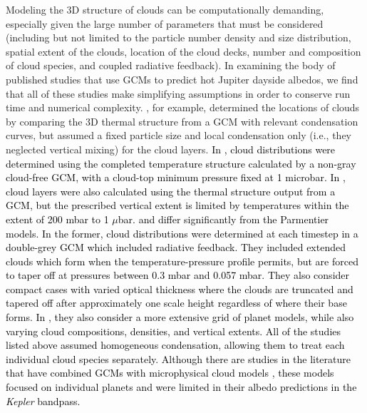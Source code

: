 \documentclass[twocolumn]{aastex63}
\begin{document}
Modeling the 3D structure of clouds can be computationally demanding, especially given the large number of parameters that must be considered (including but not limited to the particle number density and size distribution, spatial extent of the clouds, location of the cloud decks, number and composition of cloud species, and coupled radiative feedback). In examining the body of published studies that use GCMs to predict hot Jupiter dayside albedos, we find that all of these studies make simplifying assumptions in order to conserve run time and numerical complexity. \citet{oreshenko2016}, for example, determined the locations of clouds by comparing the 3D thermal structure from a GCM with relevant condensation curves, but assumed a fixed particle size and local condensation only (i.e., they neglected vertical mixing) for the cloud layers. \textcolor{black}{In \citet{parmentier2016}, cloud distributions were determined using the completed temperature structure calculated by a non-gray cloud-free GCM, with a cloud-top minimum pressure fixed at 1 microbar.  In \citet{parmentier2021}, cloud layers were also calculated using the thermal structure output from a GCM, but the prescribed vertical extent is limited by temperatures within the extent of 200 mbar to 1 $\mu$bar. \cite{roman2019} and \cite{roman2021} differ significantly from the Parmentier models. In the former, cloud distributions were determined at each timestep in a double-grey GCM which included radiative feedback. They included extended clouds which form when the temperature-pressure profile permits, but are forced to taper off at pressures between 0.3 mbar and 0.057 mbar. They also consider compact cases with varied optical thickness where the clouds are truncated and tapered off after approximately one scale height regardless of where their base forms. In \cite{roman2021}, they also consider a more extensive grid of planet models, while also varying cloud compositions, densities, and vertical extents. All of the studies listed above assumed homogeneous condensation, allowing them to treat each individual cloud species separately. Although there are studies in the literature that have combined GCMs with microphysical cloud models \citep[e.g.,][]{lee2015,lines2018,helling2019a,helling2019b,helling2020}, these models focused on individual planets and were limited in their albedo predictions in the \emph{Kepler} bandpass.} 
\end{document}
